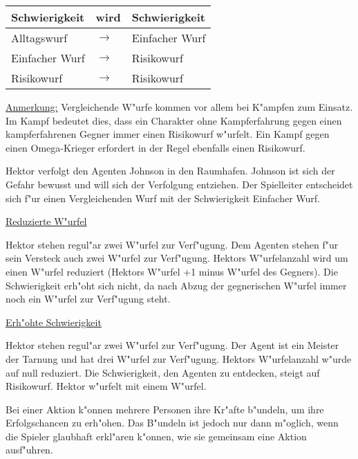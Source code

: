 \begin{center}\begin{tabular}{m{3cm} m{5.5ex} m{3.5cm}}
    \textbf{Schwierigkeit} & \textbf{wird} & \textbf{Schwierigkeit} \\\hline
    Alltagswurf            & $\rightarrow$ & Einfacher Wurf \\
    Einfacher Wurf         & $\rightarrow$ & Risikowurf \\
    Risikowurf             & $\rightarrow$ & Risikowurf \\
\end{tabular}\end{center}

\underline{Anmerkung:} Vergleichende W"urfe kommen vor allem bei K"ampfen zum Einsatz. Im Kampf bedeutet dies, dass ein Charakter ohne Kampferfahrung gegen einen kampferfahrenen Gegner immer einen Risikowurf w"urfelt. Ein Kampf gegen einen Omega-Krieger erfordert in der Regel ebenfalls einen Risikowurf.

\medskip
\begin{ruleexample}
    Hektor verfolgt den Agenten Johnson in den Raumhafen. Johnson ist sich der Gefahr bewusst und will sich der Verfolgung entziehen. Der Spielleiter entscheidet sich f"ur einen Vergleichenden Wurf mit der Schwierigkeit Einfacher Wurf.

    \underline{Reduzierte W"urfel}

    Hektor stehen regul"ar zwei W"urfel zur Verf"ugung. Dem Agenten stehen f"ur sein Versteck auch zwei W"urfel zur Verf"ugung. Hektors W"urfelanzahl wird um einen W"urfel reduziert (Hektors W"urfel +1 minus W"urfel des Gegners). Die Schwierigkeit erh"oht sich nicht, da nach Abzug der gegnerischen W"urfel immer noch ein W"urfel zur Verf"ugung steht.

    \underline{Erh"ohte Schwierigkeit}

    Hektor stehen regul"ar zwei W"urfel zur Verf"ugung. Der Agent ist ein Meister der Tarnung und hat drei W"urfel zur Verf"ugung. Hektors W"urfelanzahl w"urde auf null reduziert. Die Schwierigkeit, den Agenten zu entdecken, steigt auf Risikowurf. Hektor w"urfelt mit einem W"urfel.
\end{ruleexample}

Bei einer Aktion k"onnen mehrere Personen ihre Kr"afte b"undeln, um ihre Erfolgschancen zu erh"ohen. Das B"undeln ist jedoch nur dann m"oglich, wenn die Spieler glaubhaft erkl"aren k"onnen, wie sie gemeinsam eine Aktion ausf"uhren.

